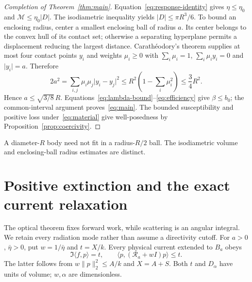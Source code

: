 \documentclass[11pt]{article}
\newcommand{\ip}[2]{\langle #1,#2\rangle}
\newcommand{\norm}[1]{\lVert #1\rVert}
\newcommand{\abs}[1]{\lvert #1\rvert}
\begin{document}
\begin{proof}[Completion of Theorem~\ref{thm:main}]
Equation~\eqref{eq:response-identity} gives $\eta\leq\eta_0$ and $\mathcal M\leq\eta_0\abs D$. The isodiametric inequality yields $\abs D\leq\pi R^3/6$. To bound an enclosing radius, center a smallest enclosing ball of radius $a$. Its center belongs to the convex hull of its contact set; otherwise a separating hyperplane permits a displacement reducing the largest distance. Carath\'eodory's theorem supplies at most four contact points $y_i$ and weights $\mu_i\geq0$ with $\sum_i\mu_i=1$, $\sum_i\mu_iy_i=0$ and $\abs{y_i}=a$. Therefore
\[
 2a^2=\sum_{i,j}\mu_i\mu_j\abs{y_i-y_j}^2
 \leq R^2\left(1-\sum_i\mu_i^2\right)\leq\frac34R^2.
\]
Hence $a\leq\sqrt{3/8}\,R$. Equations~\eqref{eq:lambda-bound}--\eqref{eq:efficiency} give $\beta\leq b_0$; the common-interval argument proves~\eqref{eq:main}. The bounded susceptibility and positive loss under~\eqref{eq:material} give well-posedness by Proposition~\ref{prop:coercivity}.
\end{proof}
A diameter-$R$ body need not fit in a radius-$R/2$ ball. The isodiametric volume and enclosing-ball radius estimates are distinct.

\section{Positive extinction and the exact current relaxation}\label{sec:resolvent}
The optical theorem fixes forward work, while scattering is an angular integral. We retain every radiation mode rather than assume a directivity cutoff. For $a>0$, $\bar\eta>0$, put $w=1/\bar\eta$ and $t=X/k$. Every physical current extended to $B_a$ obeys
\begin{equation}\label{eq:relaxation}
 \Im\ip f p=t,\qquad
 \ip p{(\mathcal R_a+wI)p}\leq t.
\end{equation}
The latter follows from $w\norm p_2^2\leq A/k$ and $X=A+S$. Both $t$ and $D_\alpha$ have units of volume; $w,\alpha$ are dimensionless.
\end{document}
